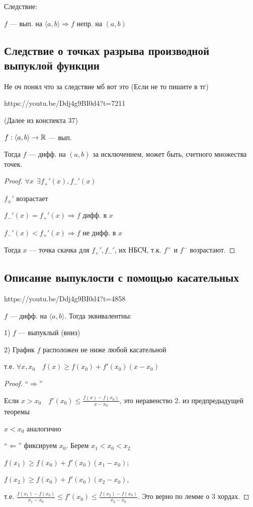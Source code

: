 \documentclass[../main.tex]{subfiles}
\begin{document}
Следствие:

\begin{consequence}
    $f$ --- вып. на $\langle a,b\rangle \Rightarrow f$ непр. на $(a,b)$
\end{consequence}

\newpage


\subsection{Следствие о точках разрыва производной выпуклой функции}

Не оч понял что за следствие мб вот это (Если не то пишите в тг)

https://youtu.be/Ddj4g9BI0d4?t=7211

(Далее из конспекта 37)

\begin{remark}
    $f:\langle a,b\rangle\to\mathbb{R}$ --- вып.

    Тогда $f$ --- дифф. на $(a,b)$ за исключением, может быть, счетного множества точек.
\end{remark}

\begin{proof}
    $\forall x \ \ \exists f_+'(x), f_-'(x)$

    $f_\pm'$ возрастает

    $f_-'(x)=f_+'(x)\Rightarrow f$ дифф. в $x$

    $f_-'(x)<f_+'(x)\Rightarrow f$ не дифф. в $x$

    Тогда $x$ --- точка скачка для $f_+', f_-'$, их НБСЧ, т.к. $f^+$ и $f^-$ возрастают.
\end{proof}


\newpage


\subsection{Описание выпуклости с помощью касательных}
https://youtu.be/Ddj4g9BI0d4?t=4858

\begin{theorem}
    $f$ --- дифф. на $\langle a,b\rangle$. 
    Тогда эквивалентны:  
    
    1) $f$ --- выпуклый (вниз)
    
    2) График $f$ расположен не ниже любой касательной

    т.е. $\forall x, x_0 \quad f(x)\geq f(x_0)+f'(x_0)(x-x_0)$
\end{theorem}

\begin{proof}
    ``$\Rightarrow$''

    Если $x>x_0 \quad f'(x_0)\leq\frac{f(x)-f(x_0)}{x-x_0}$, это неравенство 2. из предпредыдущей теоремы

    $x<x_0$ аналогично

    ``$\Leftarrow$'' фиксируем $x_0$. Берем $x_1<x_0<x_2$

    $f(x_1)\geq f(x_0)+f'(x_0)(x_1-x_0)$;
    
    $f(x_2)\geq f(x_0)+f'(x_0)(x_2-x_0)$,
    
    т.е. $\frac{f(x_1)-f(x_0)}{x_1-x_0}\leq f'(x_0)\leq \frac{f(x_2)-f(x_0)}{x_2-x_0}$. Это верно по лемме о 3 хордах.
\end{proof}
\newpage
\end{document}
